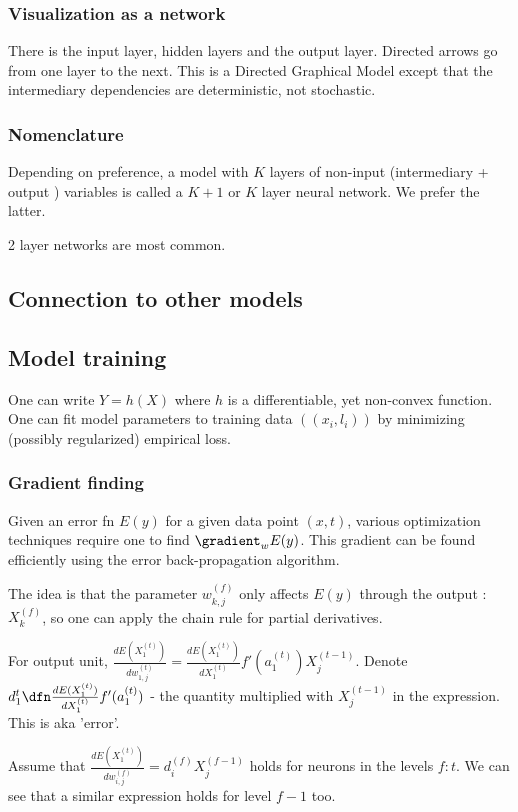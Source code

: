 \documentclass[oneside, article]{memoir}
\begin{document}
\subsubsection{Visualization as a network}
There is the input layer, hidden layers and the output layer. Directed arrows go from one layer to the next. This is a Directed Graphical Model except that the intermediary dependencies are deterministic, not stochastic.

\subsubsection{Nomenclature}
Depending on preference, a model with $K$ layers of non-input (intermediary + output ) variables is called a $K+1$ or $K$ layer neural network. We prefer the latter.

2 layer networks are most common.

\subsection{Connection to other models}
\tbc

\subsection{Model training}
One can write $Y = h(X)$ where $h$ is a differentiable, yet non-convex function. One can fit model parameters to training data $((x_i, l_i))$ by minimizing (possibly regularized) empirical loss.

\subsubsection{Gradient finding}
Given an error fn $E(y)$ for a given data point $(x, t)$, various optimization techniques require one to find $\gradient_{w} E(y)$. This gradient can be found efficiently using the error back-propagation algorithm.

The idea is that the parameter $w_{k, j}^{(f)}$ only affects $E(y)$ through the output : $X_k^{(f)}$, so one can apply the chain rule for partial derivatives.

For output unit, $\frac{dE(X_1^{(t)})}{dw_{1, j}^{(t)}} = \frac{dE(X_1^{(t)})}{dX_1^{(t)}} f'(a_1^{(t)}) X_j^{(t-1)}$. Denote $d_1^{t} \dfn \frac{dE(X_1^{(t)})}{dX_1^{(t)}} f'(a_1^{(t)})$ - the quantity multiplied with $X_j^{(t-1)}$ in the expression. This is aka 'error'.

Assume that $\frac{dE(X_1^{(t)})}{dw_{i, j}^{(f)}} = d_i^{(f)} X_j^{(f-1)}$ holds for neurons in the levels $f:t$. We can see that a similar expression holds for level $f-1$ too.
\end{document}
